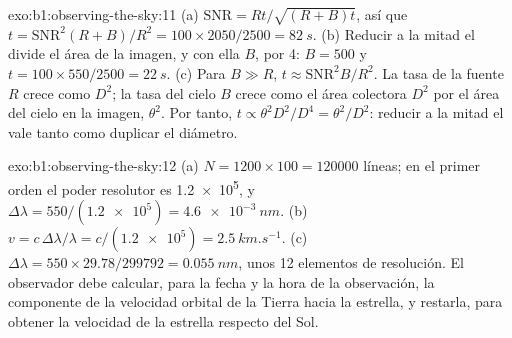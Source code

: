 \begin{solution}{exo:b1:observing-the-sky:11}
(a) $\mathrm{SNR} = Rt/\sqrt{(R + B)t}$, así que $t = \mathrm{SNR}^2(R + B)/R^2
= 100\times2050/2500 = \qty{82}{s}$. (b) Reducir a la mitad el  divide el área de
la imagen, y con ella $B$, por 4: $B = 500$ y $t = 100\times550/2500 =
\qty{22}{s}$. (c) Para $B \gg R$, $t \approx \mathrm{SNR}^2B/R^2$. La tasa de la fuente $R$
crece como $D^2$; la tasa del cielo $B$ crece como el área colectora $D^2$ por el área del
cielo en la imagen, $\theta^2$. Por tanto, $t \propto
\theta^2D^2/D^4 = \theta^2/D^2$: reducir a la mitad el  vale tanto como duplicar el
diámetro.
\end{solution}

\begin{solution}{exo:b1:observing-the-sky:12}
(a) $N = 1200\times100 = \num{120000}$ líneas; en el primer orden el poder resolutor es
\num{1.2e5}, y $\Delta\lambda = 550/(\num{1.2e5}) =
\qty{4.6e-3}{nm}$. (b) $v = c\,\Delta\lambda/\lambda = c/(\num{1.2e5}) =
\qty{2.5}{km.s^{-1}}$. (c) $\Delta\lambda = 550\times29.78/\num{299792} =
\qty{0.055}{nm}$, unos 12 elementos de resolución. El observador debe calcular, para la fecha
y la hora de la observación, la componente de la velocidad orbital de la Tierra hacia la
estrella, y restarla, para obtener la velocidad de la estrella respecto del Sol.
\end{solution}

